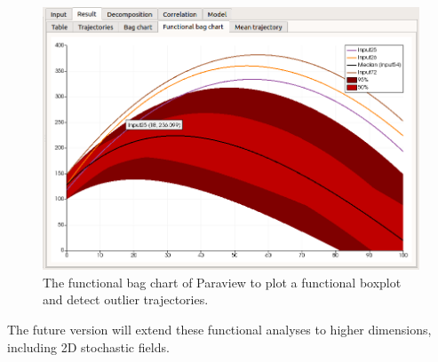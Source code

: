 \documentclass{uncecomp2019}
\begin{document}
\begin{figure}
\centering
\includegraphics[width=\textwidth]{figures/functional_bag_chart-focus.png}
\caption{The functional bag chart of Paraview to plot a functional boxplot and detect outlier trajectories.}
\label{fig-functionnalbagchart}
\end{figure}

The future version will extend these functional analyses to higher dimensions, including 2D stochastic fields. 






\end{document}
